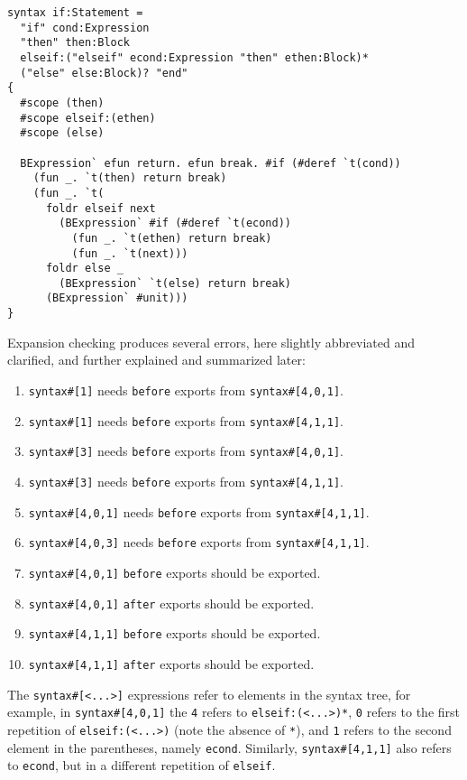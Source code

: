 \documentclass{kththesis}
\begin{document}
\begin{verbatim}
syntax if:Statement =
  "if" cond:Expression
  "then" then:Block
  elseif:("elseif" econd:Expression "then" ethen:Block)*
  ("else" else:Block)? "end"
{
  #scope (then)
  #scope elseif:(ethen)
  #scope (else)

  BExpression` efun return. efun break. #if (#deref `t(cond))
    (fun _. `t(then) return break)
    (fun _. `t(
      foldr elseif next
        (BExpression` #if (#deref `t(econd))
          (fun _. `t(ethen) return break)
          (fun _. `t(next)))
      foldr else _
        (BExpression` `t(else) return break)
      (BExpression` #unit)))
}
\end{verbatim}

Expansion checking produces several errors, here slightly abbreviated and clarified, and further explained and summarized later:
\begin{enumerate}
  \item \texttt{syntax#[1]} needs \texttt{before} exports from \texttt{syntax#[4,0,1]}.
  \item \texttt{syntax#[1]} needs \texttt{before} exports from \texttt{syntax#[4,1,1]}.
  \item \texttt{syntax#[3]} needs \texttt{before} exports from \texttt{syntax#[4,0,1]}.
  \item \texttt{syntax#[3]} needs \texttt{before} exports from \texttt{syntax#[4,1,1]}.
  \item \texttt{syntax#[4,0,1]} needs \texttt{before} exports from \texttt{syntax#[4,1,1]}.
  \item \texttt{syntax#[4,0,3]} needs \texttt{before} exports from \texttt{syntax#[4,1,1]}.
  \item \texttt{syntax#[4,0,1]} \texttt{before} exports should be exported.
  \item \texttt{syntax#[4,0,1]} \texttt{after} exports should be exported.
  \item \texttt{syntax#[4,1,1]} \texttt{before} exports should be exported.
  \item \texttt{syntax#[4,1,1]} \texttt{after} exports should be exported.
\end{enumerate}

The \texttt{syntax#[<...>]} expressions refer to elements in the syntax tree, for example, in \texttt{syntax#[4,0,1]} the \texttt{4} refers to \texttt{elseif:(<...>)*}, \texttt{0} refers to the first repetition of \texttt{elseif:(<...>)} (note the absence of \texttt{*}), and \texttt{1} refers to the second element in the parentheses, namely \texttt{econd}. Similarly, \texttt{syntax#[4,1,1]} also refers to \texttt{econd}, but in a different repetition of \texttt{elseif}.
\end{document}

